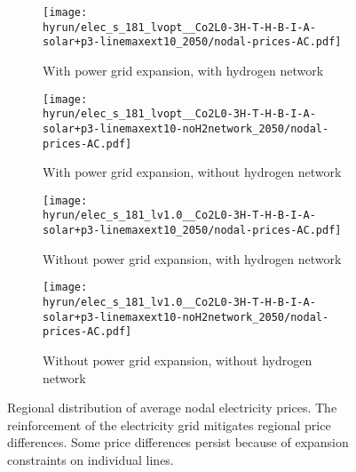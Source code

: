 \begin{figure}
    \begin{subfigure}{0.49\textwidth}
        \centering
        \caption{With power grid expansion, with hydrogen network}
        \texttt{[image: \\hyrun/elec\_s\_181\_lvopt\_\_Co2L0-3H-T-H-B-I-A-solar+p3-linemaxext10\_2050/nodal-prices-AC.pdf]}
    \end{subfigure}
    \begin{subfigure}{0.49\textwidth}
        \centering
        \caption{With power grid expansion, without hydrogen network}
        \texttt{[image: \\hyrun/elec\_s\_181\_lvopt\_\_Co2L0-3H-T-H-B-I-A-solar+p3-linemaxext10-noH2network\_2050/nodal-prices-AC.pdf]}
    \end{subfigure}
    \begin{subfigure}{0.49\textwidth}
        \centering
        \caption{Without power grid expansion, with hydrogen network}
        \texttt{[image: \\hyrun/elec\_s\_181\_lv1.0\_\_Co2L0-3H-T-H-B-I-A-solar+p3-linemaxext10\_2050/nodal-prices-AC.pdf]}
    \end{subfigure}
    \begin{subfigure}{0.49\textwidth}
        \centering
        \caption{Without power grid expansion, without hydrogen network}
        \texttt{[image: \\hyrun/elec\_s\_181\_lv1.0\_\_Co2L0-3H-T-H-B-I-A-solar+p3-linemaxext10-noH2network\_2050/nodal-prices-AC.pdf]}
    \end{subfigure}
    \caption{Regional distribution of average nodal electricity prices. The reinforcement of the electricity grid mitigates regional price differences. Some price differences persist because of expansion constraints on individual lines.}
    \label{fig:si:lmp-ac}
\end{figure}

